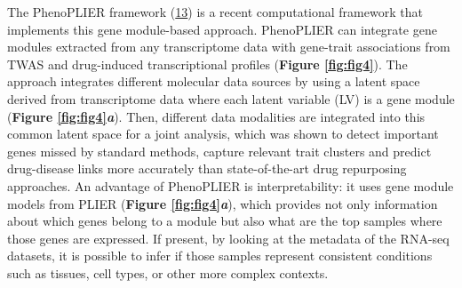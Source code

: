 The PhenoPLIER framework (\protect\hyperlink{ref-NM3rHx1i}{13}) is a recent computational framework that implements this gene module-based approach.
PhenoPLIER can integrate gene modules extracted from any transcriptome data with gene-trait associations from TWAS and drug-induced transcriptional profiles (\textbf{Figure \ref{fig:fig4}}).
The approach integrates different molecular data sources by using a latent space derived from transcriptome data where each latent variable (LV) is a gene module (\textbf{Figure \ref{fig:fig4}\emph{a}}).
Then, different data modalities are integrated into this common latent space for a joint analysis, which was shown to detect important genes missed by standard methods, capture relevant trait clusters and predict drug-disease links more accurately than state-of-the-art drug repurposing approaches.
An advantage of PhenoPLIER is interpretability: it uses gene module models from PLIER (\textbf{Figure \ref{fig:fig4}\emph{a}}), which provides not only information about which genes belong to a module but also what are the top samples where those genes are expressed.
If present, by looking at the metadata of the RNA-seq datasets, it is possible to infer if those samples represent consistent conditions such as tissues, cell types, or other more complex contexts.

